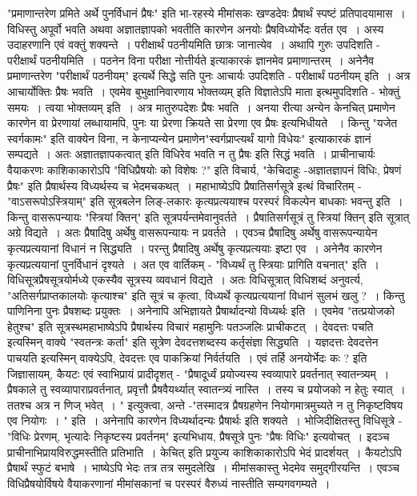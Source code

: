 {"प्रमाणान्तरेण प्रमिते अर्थे पुनर्विधानं प्रैषः" इति भा-रहस्ये मीमांसकः खण्डदेवः प्रैषार्थं स्पष्टं प्रतिपादयामास~। विधिस्तु अपूर्वो भवति अथवा अज्ञातज्ञापको भवतीति कारणेन अनयोः प्रैषविध्योर्भेदः वर्तत एव~। अस्य उदाहरणानि एवं वक्तुं शक्यन्ते~। परीक्षार्थं पठनीयमिति छात्रः जानात्येव~। अथापि गुरुः उपदिशति - परीक्षार्थं पठनीयमिति~। पठनेन विना परीक्षा नोत्तीर्यते इत्याकारकं ज्ञानमेव प्रमाणान्तरम्~। अनेनैव प्रमाणान्तरेण "परीक्षार्थं पठनीयम्" इत्यर्थे सिद्धे सति पुनः आचार्यः उपदिशति - परीक्षार्थं पठनीयम् इति~। अत्र आचार्योक्तिः प्रैषः भवति~। एवमेव बुभुक्षानिवारणाय भोक्तव्यम् इति विज्ञातेऽपि माता इत्थमुपदिशति - भोक्तुं समयः~। त्वया भोक्तव्यम् इति~। अत्र मातुरुपदेशः प्रैषः भवति~। अनया रीत्या \hbox{अन्येन} केनचित् प्रमाणेन कारणेन वा  प्रेरणायां लब्धायामपि, पुनः या प्रेरणा क्रियते सा प्रेरणा एव प्रैषः इत्यभिधीयते ~। किन्तु "यजेत स्वर्गकामः" इति वाक्येन विना, न केनाप्यन्येन प्रमाणेन\break "स्वर्गप्राप्त्यर्थं यागो विधेयः" इत्याकारकं ज्ञानं सम्पद्यते~। अतः अज्ञातज्ञापकत्वात्  इति विधिरेव भवति न तु प्रैषः इति सिद्धं भवति~। प्राचीनाचार्यः वैयाकरणः काशिकाकारोऽपि "विधिप्रैषयोः को विशेषः ?" इति विचार्य, "केचिदाहुः -अज्ञातज्ञापनं विधिः, प्रेषणं प्रैषः" इति प्रैषार्थस्य विध्यर्थस्य च भेदमचकथत्~। महाभाष्येऽपि प्रैषातिसर्गसूत्रे इत्थं विचारितम् - "वाऽसरूपोऽस्त्रियाम्" इति सूत्रबलेन लिङ्-लकारः कृत्यप्रत्ययाश्च परस्परं विकल्पेन बाधकाः भवन्तु इति~। किन्तु वासरूपन्यायः "स्त्रियां क्तिन्" इति सूत्रपर्यन्तमेवानुवर्तते~। प्रैषातिसर्गसूत्रं तु स्त्रियां क्तिन् इति सूत्रात् अग्रे विद्यते~। अतः प्रैषादिषु अर्थेषु वासरूपन्यायः न प्रवर्तते~। एवञ्च प्रैषादिषु अर्थेषु वासरूपन्यायेन कृत्यप्रत्ययानां विधानं न सिद्ध्यति~। परन्तु प्रैषादिषु अर्थेषु कृत्यप्रत्ययाः इष्टा एव~। अनेनैव कारणेन कृत्यप्रत्ययानां पुनर्विधानं दृश्यते~। अत एव वार्तिकम् - "विध्यर्थं तु स्त्रियाः प्रागिति वचनात्" इति~। विधिसूत्रप्रैषसूत्रयोर्मध्ये एकस्यैव सूत्रस्य व्यवधानं विद्यते~। अतः विधिसूत्रात् विधिशब्दं अनुवर्त्य, "अतिसर्गप्राप्तकालयोः कृत्याश्च" इति सूत्रं च कृत्वा, विध्यर्थे कृत्यप्रत्ययानां विधानं सुलभं खलु ?~। किन्तु पाणिनिना पुनः प्रैषशब्दः प्रयुक्तः~। अनेनापि अभिज्ञायते प्रैषार्थादन्यो विध्यर्थः इति~। एवमेव "तत्प्रयोजको हेतुश्च" इति सूत्रस्थमहाभाष्येऽपि प्रैषार्थस्य विचारं महामुनिः पतञ्जलिः प्राचीकटत्~।  देवदत्तः पचति इत्यस्मिन् वाक्ये "स्वतन्त्रः कर्ता" इति सूत्रेण देवदत्तशब्दस्य कर्तृसंज्ञा सिद्ध्यति~। यज्ञदत्तः देवदत्तेन पाचयति इत्यस्मिन् वाक्येऽपि, देवदत्तः एव पाकक्रियां निर्वर्तयति~। एवं तर्हि अनयोर्भेदः कः ? इति जिज्ञासायम्, कैयटः एवं स्वाभिप्रायं प्रादीदृशत्  - "प्रैषादूर्ध्वं प्रयोज्यस्य स्वव्यापारे प्रवर्तनात् स्वातन्त्र्यम्~। प्रैषकाले तु स्वव्यापाराप्रवर्तनात्, प्रवृत्तौ प्रैषवैयर्थ्यात् स्वातन्त्र्यं नास्ति~। तस्य च  प्रयोजको न हेतुः स्यात्~। ततश्च अत्र न णिज् भवेत्~। " इत्युक्त्वा, अन्ते -"तस्मादत्र प्रैषग्रहणेन नियोगमात्रमुच्यते न तु निकृष्टविषय एव नियोगः~। " इति~। अनेनापि कारणेन विध्यर्थादन्यः प्रैषार्थः इति  शक्यते~। भोजिदीक्षितस्तु विधिसूत्रे - "विधिः प्रेरणम्, भृत्यादेः निकृष्टस्य प्रवर्तनम्" इत्यभिधाय, प्रैषसूत्रे पुनः "प्रैषः विधिः" इत्यवोचत्~। इदञ्च प्राचीनाभिप्रायविरुद्धमस्तीति प्रतिभाति~। केचित् इति प्रयुज्य काशिकाकारोऽपि भेदं प्रादर्शयत्~। कैयटोऽपि प्रैषार्थं स्फुटं बभाषे~। भाष्येऽपि भेदः तत्र तत्र समुदलेखि~। मीमांसकास्तु भेदमेव समुद्गीरयन्ति~। एवञ्च विधिप्रैषयोर्विषये  वैयाकरणानां मीमांसकानां च परस्परं वैरुध्यं नास्तीति सम्यगवगम्यते~। 
}
